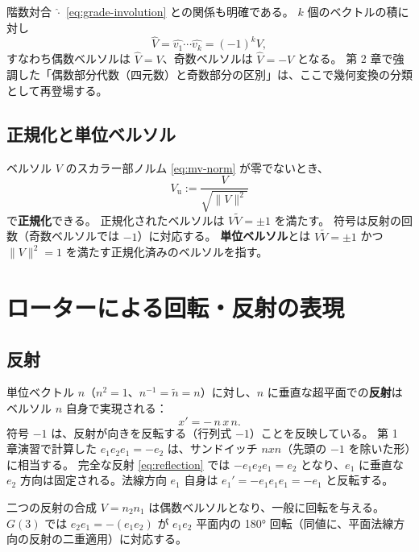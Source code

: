 \documentclass[dvipdfmx,a4paper,oneside]{jsbook}
\numberwithin{equation}{chapter}
\begin{document}
階数対合 \(\widehat{\cdot}\) \eqref{eq:grade-involution} との関係も明確である。
\(k\) 個のベクトルの積に対し
\begin{equation}
  \widehat{V} = \widehat{v_1}\cdots\widehat{v_k} = (-1)^k V,
  \label{eq:versor-grade-inv}
\end{equation}
すなわち偶数ベルソルは \(\widehat{V}=V\)、奇数ベルソルは \(\widehat{V}=-V\) となる。
第 2 章で強調した「偶数部分代数（四元数）と奇数部分の区別」は、ここで幾何変換の分類として再登場する。

\subsection{正規化と単位ベルソル}

ベルソル \(V\) のスカラー部ノルム \eqref{eq:mv-norm} が零でないとき、
\begin{equation}
  V_{\mathrm{u}} := \frac{V}{\sqrt{\|V\|^2}}
  \label{eq:versor-normalize}
\end{equation}
で\textbf{正規化}できる。
正規化されたベルソルは \(V\widetilde{V} = \pm 1\) を満たす。
符号は反射の回数（奇数ベルソルでは \(-1\)）に対応する。
\textbf{単位ベルソル}とは \(V\widetilde{V}=\pm 1\) かつ \(\|V\|^2=1\) を満たす正規化済みのベルソルを指す。

\section{ローターによる回転・反射の表現}

\subsection{反射}

単位ベクトル \(n\)（\(n^2=1\)、\(n^{-1}=\widetilde{n}=n\)）に対し、\(n\) に垂直な超平面での\textbf{反射}はベルソル \(n\) 自身で実現される：
\begin{equation}
  x' = -\,n\,x\,n.
  \label{eq:reflection}
\end{equation}
符号 \(-1\) は、反射が向きを反転する（行列式 \(-1\)）ことを反映している。
第 1 章演習で計算した \(e_1 e_2 e_1 = -e_2\) は、サンドイッチ \(n x n\)（先頭の \(-1\) を除いた形）に相当する。
完全な反射 \eqref{eq:reflection} では \(-e_1 e_2 e_1 = e_2\) となり、\(e_1\) に垂直な \(e_2\) 方向は固定される。法線方向 \(e_1\) 自身は \(e_1' = -e_1 e_1 e_1 = -e_1\) と反転する。

二つの反射の合成 \(V = n_2 n_1\) は偶数ベルソルとなり、一般に回転を与える。
\(G(3)\) では \(e_2 e_1 = -(e_1 e_2)\) が \(e_1 e_2\) 平面内の 180° 回転（同値に、平面法線方向の反射の二重適用）に対応する。
\end{document}
